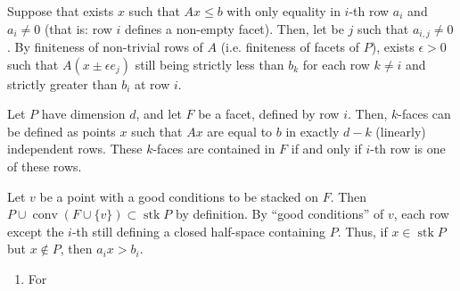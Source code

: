 \documentclass[11pt]{amsart}
\DeclareMathOperator{\conv}{conv}
\DeclareMathOperator{\stack}{stk}
\begin{document}
\begin{enumerate}
       Suppose that exists $x$ such that $Ax \leq b$ with only equality in $i$-th row $a_i$ and $a_i\neq 0$ (that is: row $i$ defines a non-empty facet). Then, let be $j$ such that $a_{i,j}\neq 0$. By finiteness of non-trivial rows of $A$ (i.e. finiteness of facets of $P$), exists $\epsilon >0$ such that $A(x\pm\epsilon e_j)$ still being strictly less than $b_k$ for each row $k\neq i$ and strictly greater than $b_i$ at row $i$.
       
       Let $P$ have dimension $d$, and let $F$ be a facet, defined by row $i$. Then, $k$-faces can be defined as points $x$ such that $Ax$ are equal to $b$ in exactly $d-k$ (linearly) independent rows. These $k$-faces are contained in $F$ if and only if $i$-th row is one of these rows.
       
       Let $v$ be a point with a good conditions to be stacked on $F$. Then $P \cup \conv(F\cup \{v\}) \subset \stack P$ by definition. By ``good conditions'' of $v$, each row except the $i$-th still defining a closed half-space containing $P$. Thus, if $x\in \stack{P}$ but $x\notin P$, then $a_ix>b_i$.
       
       \begin{enumerate}
         \item For
       \end{enumerate}
       
     \end{enumerate}
  
\end{document}

